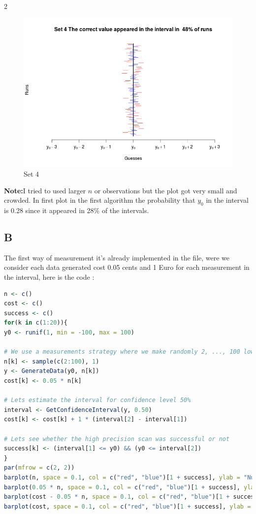 \documentclass{article}
\begin{document}
\begin{multicols*}{2}
\begin{flushleft}
\begin{flushleft}
\begin{figure}[H]
\begin{center}
		\includegraphics[scale=0.3]{plotset4.png}
	\end{center}
	\caption{Set 4 }
\end{figure}
\textbf{Note:}I tried to used larger \(n\) or observations but the plot got very small and crowded.
In first plot in the first algorithm the probability that \(y_0\) in the interval is 0.28 since it appeared in 28\% of the intervals.

{\centering\subsection*{B}}
The first way of measurement it's already implemented in the file, were we consider each data generated cost 0.05 cents and 1 Euro for each measurement in the interval, here is the code :
\begin{lstlisting}[language=R]
n <- c()
cost <- c()
success <- c()
for(k in c(1:20)){
y0 <- runif(1, min = -100, max = 100)

# We use a measurements strategy where we make randomly 2, ..., 100 low precision measurements 
n[k] <- sample(c(2:100), 1)
y <- GenerateData(y0, n[k])
cost[k] <- 0.05 * n[k]

# Lets estimate the interval for confidence level 50%
interval <- GetConfidenceInterval(y, 0.50)
cost[k] <- cost[k] + 1 * (interval[2] - interval[1])

# Lets see whether the high precision scan was successful or not
success[k] <- (interval[1] <= y0) && (y0 <= interval[2]) 
}
par(mfrow = c(2, 2))
barplot(n, space = 0.1, col = c("red", "blue")[1 + success], ylab = "Number of measurements", ylim=c(0, 100),  xlab = "Run")
barplot(0.05 * n, space = 0.1, col = c("red", "blue")[1 + success], ylab = "Cost of low-quality measurements", ylim=c(0, 5),  xlab = "Run")
barplot(cost - 0.05 * n, space = 0.1, col = c("red", "blue")[1 + success], ylab = "Cost of high-quality scan", xlab = "Run")
barplot(cost, space = 0.1, col = c("red", "blue")[1 + success], ylab = "Overall cost", ylim = c(0,10), xlab = "Run")


\end{lstlisting}
\end{flushleft}
\end{flushleft}
\end{multicols*}
\end{document}
